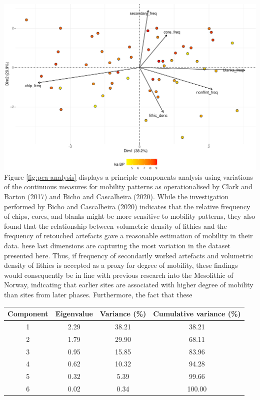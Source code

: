\documentclass[
]{article}
\begin{document}
\includegraphics{../figures/pca-analysis-1.pdf}
Figure \ref{fig:pca-analysis} displays a principle components analysis using variations of the continuous measures for mobility patterns as operationalised by Clark and Barton (2017) and Bicho and Cascalheira (2020). While the investigation performed by Bicho and Cascalheira (2020) indicates that the relative frequency of chips, cores, and blanks might be more sensitive to mobility patterns, they also found that the relationship between volumetric density of lithics and the frequency of retouched artefacts gave a reasonable estimation of mobility in their data. hese last dimensions are capturing the most variation in the dataset presented here. Thus, if frequency of secondarily worked artefacts and volumetric density of lithics is accepted as a proxy for degree of mobility, these findings would consequently be in line with previous research into the Mesolithic of Norway, indicating that earlier sites are associated with higher degree of mobility than sites from later phases. Furthermore, the fact that these

\captionsetup[table]{labelformat=empty,skip=1pt}
\begin{longtable}{cccc}
\toprule
Component & Eigenvalue & Variance (\%) & Cumulative variance (\%) \\ 
\midrule
1 & 2.29 & 38.21 & 38.21 \\ 
2 & 1.79 & 29.90 & 68.11 \\ 
3 & 0.95 & 15.85 & 83.96 \\ 
4 & 0.62 & 10.32 & 94.28 \\ 
5 & 0.32 & 5.39 & 99.66 \\ 
6 & 0.02 & 0.34 & 100.00 \\ 
\bottomrule
\end{longtable}
\end{document}
